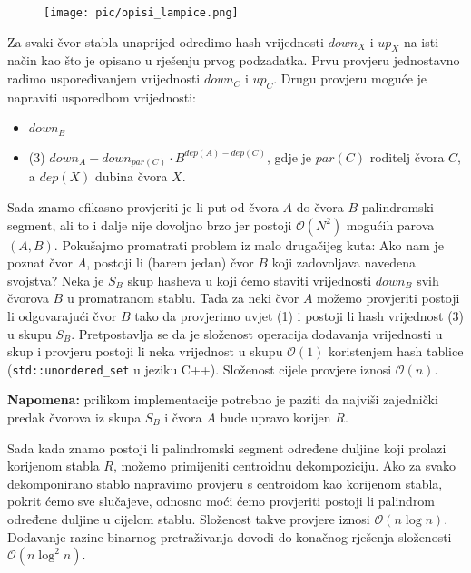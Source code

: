 \documentclass[a4paper]{article}
\begin{document}
\begin{figure}[!htbp]
\centering
\texttt{[image: pic/opisi\_lampice.png]}
\end{figure}

Za svaki čvor stabla unaprijed odredimo hash vrijednosti $down_X$ i $up_X$ na
isti način kao što je opisano u rješenju prvog podzadatka. Prvu provjeru
jednostavno radimo uspoređivanjem vrijednosti $down_C$ i $up_C$. Drugu provjeru
moguće je napraviti usporedbom vrijednosti:

\begin{itemize}
  \item $down_B$
  \item (3) $down_A - down_{par(C)} \cdot B^{dep(A)-dep(C)}$, gdje je $par(C)$ roditelj
        čvora $C$, a $dep(X)$ dubina čvora $X$.
\end{itemize}

Sada znamo efikasno provjeriti je li put od čvora $A$ do čvora $B$ palindromski
segment, ali to i dalje nije dovoljno brzo jer postoji $\mathcal{O}(N^2)$
mogućih parova $(A, B)$. Pokušajmo promatrati problem iz malo drugačijeg kuta:
Ako nam je poznat čvor $A$, postoji li (barem jedan) čvor $B$ koji zadovoljava
navedena svojstva?  Neka je $S_B$ skup hasheva u koji ćemo staviti vrijednosti
$down_B$ svih čvorova $B$ u promatranom stablu. Tada za neki čvor $A$ možemo
provjeriti postoji li odgovarajući čvor $B$ tako da provjerimo uvjet (1) i
postoji li hash vrijednost (3) u skupu $S_B$. Pretpostavlja se da je složenost
operacija dodavanja vrijednosti u skup i provjeru postoji li neka vrijednost u
skupu $\mathcal{O}(1)$ koristenjem hash tablice (\texttt{std::unordered\_set} u
jeziku C++). Složenost cijele provjere iznosi $\mathcal{O}(n)$.

\textbf{Napomena:} prilikom implementacije potrebno je paziti da najviši
zajednički predak čvorova iz skupa $S_B$ i čvora $A$ bude upravo korijen $R$.

Sada kada znamo postoji li palindromski segment određene duljine koji prolazi
korijenom stabla $R$, možemo primijeniti centroidnu dekompoziciju. Ako za svako
dekomponirano stablo napravimo provjeru s centroidom kao korijenom stabla,
pokrit ćemo sve slučajeve, odnosno moći ćemo provjeriti postoji li palindrom
određene duljine u cijelom stablu. Složenost takve provjere iznosi $\mathcal{O}(n \log n)$.
Dodavanje razine binarnog pretraživanja dovodi do konačnog rješenja složenosti
$\mathcal{O}(n \log^2 n)$.

\clearpage
\end{document}
